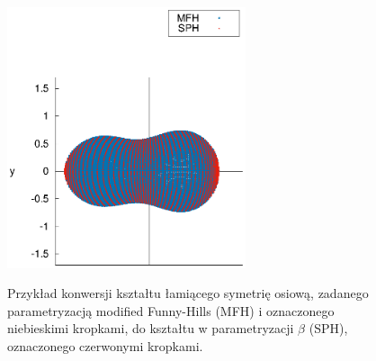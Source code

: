 \documentclass[a4paper,polish,twoside]{article}
\numberwithin{equation}{section}
\begin{document}
\begin{figure}[ht!]
    \includegraphics[width=7cm]{rys4.eps}\\
    \vspace{0.5cm}    
	\caption{Przykład konwersji kształtu łamiącego symetrię osiową, zadanego parametryzacją modified Funny-Hills (MFH) i oznaczonego niebieskimi kropkami, do kształtu w parametryzacji $\beta$ (SPH), oznaczonego czerwonymi kropkami.}
    \label{fig:example3}%
\end{figure}
\vspace*{\fill}
\end{document}
